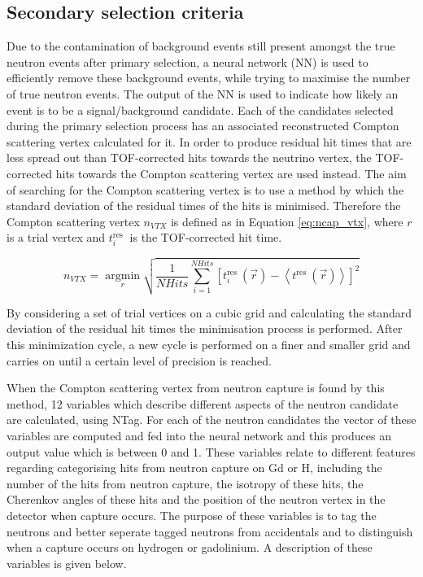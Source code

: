 \subsection{Secondary selection criteria}
Due to the contamination of background events still present amongst the true neutron events after primary selection, a neural network (NN) is used to efficiently remove these background events, while trying to maximise the number of true neutron events. The output of the NN is used to indicate how likely an event is to be a signal/background candidate. Each of the candidates selected during the primary selection process has an associated reconstructed Compton scattering vertex calculated for it. In order to produce residual hit times that are less spread out than TOF-corrected hits towards the neutrino vertex, the TOF-corrected hits towards the Compton scattering vertex are used instead. The aim of searching for the Compton scattering vertex is to use a method by which the standard deviation of the residual times of the hits is minimised. Therefore the Compton scattering vertex $n_{VTX}$ is defined as in Equation \ref{eq:ncap_vtx}, where $r$ is a trial vertex and $t_i^{\text {res }}$ is the TOF-corrected hit time.

\begin{equation}
    n_{VTX}=\underset{r}{\operatorname{argmin}}\sqrt{\frac{1}{NHits} \sum_{i=1}^{NHits}\left[t_i^{\text {res }}(\vec{r})-\left\langle t^{\text {res }}(\vec{r})\right\rangle\right]^2}
\label{eq:ncap_vtx}
\end{equation}

 

By considering a set of trial vertices on a cubic grid and calculating the standard deviation of the residual hit times the minimisation process is performed. After this minimization cycle, a new cycle is performed on a finer and smaller grid and carries on until a certain level of precision is reached. 

When the Compton scattering vertex from neutron capture is found by this method, 12 variables which describe different aspects of the neutron candidate are calculated, using NTag. For each of the neutron candidates the vector of these variables are computed and fed into the neural network and this produces an output value which is between 0 and 1. These variables relate to different features regarding categorising hits from neutron capture on Gd or H, including the number of the hits from neutron capture, the isotropy of these hits, the Cherenkov angles of these hits and the position of the neutron vertex in the detector when capture occurs. The purpose of these variables is to tag the neutrons and better seperate tagged neutrons from accidentals and to distinguish when a capture occurs on hydrogen or gadolinium. A description of these variables is given below.


